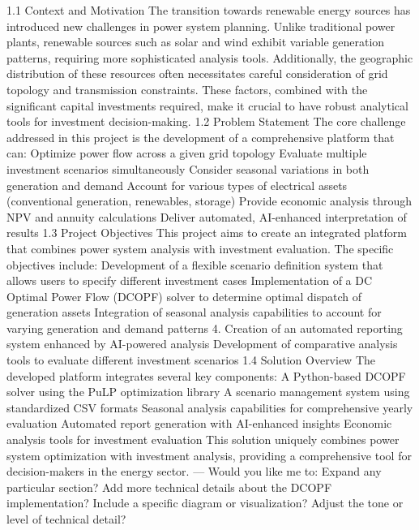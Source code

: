 1.1 Context and Motivation
The transition towards renewable energy sources has introduced new challenges in power system planning. Unlike traditional power plants, renewable sources such as solar and wind exhibit variable generation patterns, requiring more sophisticated analysis tools. Additionally, the geographic distribution of these resources often necessitates careful consideration of grid topology and transmission constraints. These factors, combined with the significant capital investments required, make it crucial to have robust analytical tools for investment decision-making.
1.2 Problem Statement
The core challenge addressed in this project is the development of a comprehensive platform that can:
Optimize power flow across a given grid topology
Evaluate multiple investment scenarios simultaneously
Consider seasonal variations in both generation and demand
Account for various types of electrical assets (conventional generation, renewables, storage)
Provide economic analysis through NPV and annuity calculations
Deliver automated, AI-enhanced interpretation of results
1.3 Project Objectives
This project aims to create an integrated platform that combines power system analysis with investment evaluation. The specific objectives include:
Development of a flexible scenario definition system that allows users to specify different investment cases
Implementation of a DC Optimal Power Flow (DCOPF) solver to determine optimal dispatch of generation assets
Integration of seasonal analysis capabilities to account for varying generation and demand patterns
4. Creation of an automated reporting system enhanced by AI-powered analysis
Development of comparative analysis tools to evaluate different investment scenarios
1.4 Solution Overview
The developed platform integrates several key components:
A Python-based DCOPF solver using the PuLP optimization library
A scenario management system using standardized CSV formats
Seasonal analysis capabilities for comprehensive yearly evaluation
Automated report generation with AI-enhanced insights
Economic analysis tools for investment evaluation
This solution uniquely combines power system optimization with investment analysis, providing a comprehensive tool for decision-makers in the energy sector.
---
Would you like me to:
Expand any particular section?
Add more technical details about the DCOPF implementation?
Include a specific diagram or visualization?
Adjust the tone or level of technical detail?